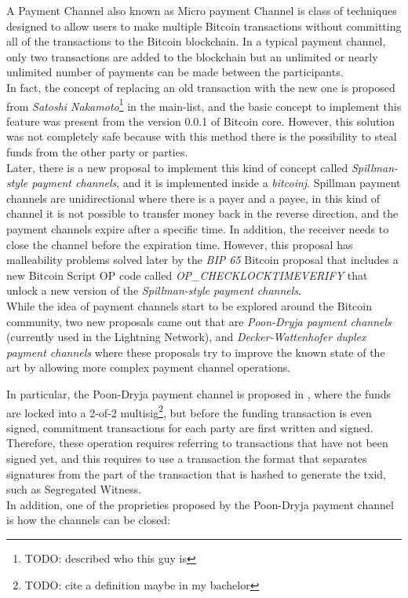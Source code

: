 A Payment Channel also known as Micro payment Channel is class of techniques designed to allow users to make multiple
Bitcoin transactions without committing all of the transactions to the Bitcoin blockchain. In a typical payment channel,
only two transactions are added to the blockchain but an unlimited or nearly unlimited number of payments
can be made between the participants.\\
In fact, the concept of replacing an old transaction with the new one is proposed from \emph{Satoshi Nakamoto}\footnote{TODO: described who this guy is} in the main-list\cite{payment-channels-satoshi}, and
the basic concept to implement this feature was present from the version 0.0.1 of Bitcoin core. However, this solution
was not completely safe because with this method there is the possibility to steal funds from the other party or parties.\\

Later, there is a new proposal to implement this kind of concept called \emph{Spillman-style payment channels}, and it is
implemented inside a \emph{bitcoinj}\cite{bitcoinj-impl}. Spillman payment channels are unidirectional where
there is a payer and a payee, in this kind of channel it is not possible to transfer money back in the reverse direction, and the payment
channels expire after a specific time.
In addition, the receiver needs to close the channel before the expiration time.
However, this proposal has malleability problems solved later by the \emph{BIP  65}\cite{bip65} Bitcoin proposal that includes a new Bitcoin Script OP code
called \emph{OP\_CHECKLOCKTIMEVERIFY} that unlock a new version of the \emph{Spillman-style payment channels}.\\
While the idea of payment channels start to be explored around the Bitcoin community, two new proposals came out that are
\emph{Poon-Dryja payment channels}\cite{lightning-network-paper} (currently used in the Lightning Network),
and \emph{Decker-Wattenhofer duplex payment channels}\cite{Decker2015fast} where these proposals try to improve the known state
of the art by allowing more complex payment channel operations.

In particular, the Poon-Dryja payment channel is proposed in \cite{lightning-network-paper}, where
the funds are locked into a 2-of-2 multisig\footnote{TODO: cite a definition maybe in my bachelor},
but before the funding transaction is even signed, commitment transactions for each party are first written and signed.
Therefore, these operation requires referring to transactions that have not been signed yet, and this requires to use a transaction
the format that separates signatures from the part of the transaction that is hashed to generate the txid, such as Segregated Witness.\\
In addition, one of the proprieties proposed by the Poon-Dryja payment channel is how the channels can be closed:

